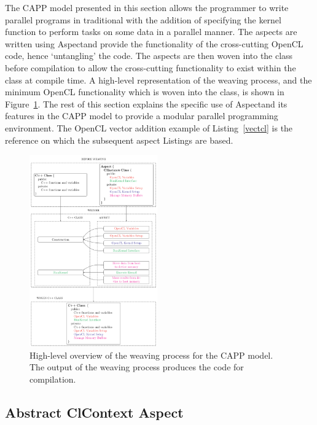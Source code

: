 \documentclass{sig-alternate-05-2015}
\begin{document}
The CAPP model presented in this section allows the programmer to
write parallel programs in traditional \CPP with the addition of specifying the kernel
function to perform tasks on some data in a parallel manner. The aspects
are written using Aspect\CPP and provide the functionality of the
cross-cutting OpenCL code, hence `untangling' the \CPP code. The aspects
are then woven into the \CPP class before compilation to allow the cross-cutting
functionality to exist within the \CPP class at compile time. A high-level
representation of the weaving process, and the minimum OpenCL functionality which is
woven into the \CPP class, is shown in Figure~\ref{fig:weaving}. 
The rest of this section explains the specific use of Aspect\CPP and its
features in the CAPP model to provide a modular parallel programming
environment. The OpenCL vector addition example of Listing~\ref{vectcl} is the
reference on which the subsequent aspect Listings are based.
\begin{figure}[!t]
	\centering
	\includegraphics[width=0.49\textwidth]{weaving}
	\caption{High-level overview of the weaving process for the CAPP
		model. The output of the weaving process produces the code for
	compilation.}
	\label{fig:weaving}
\end{figure}

\subsection{Abstract ClContext Aspect}
\end{document}
